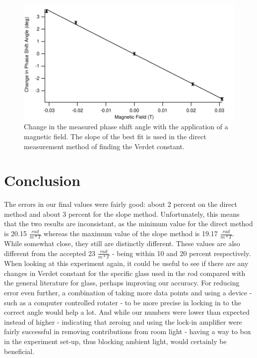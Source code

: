 \documentclass[prb,preprint]{revtex4-1}
\begin{document}
\begin{figure}[h]
\includegraphics[width=180mm]{dTheta_dT.pdf}
\caption{\label{dTheta_dT}Change in the measured phase shift angle with the application of a magnetic field. The slope of the best fit is used in the direct measurement method of finding the Verdet constant.}

\end{figure}

\section{Conclusion}
The errors in our final values were fairly good: about 2 percent on the direct method and about 3 percent for the slope method. Unfortunately, this means that the two results are inconsistant, as the minimum value for the direct method is 20.15 $\frac{rad}{m*T}$ whereas the maximum value of the slope method is 19.17 $\frac{rad}{m*T}$. While somewhat close, they still are distinctly different. These values are also different from the accepted 23 $\frac{rad}{m*T}$ - being within 10 and 20 percent respectively. When looking at this experiment again, it could be useful to see if there are any changes in Verdet constant for the specific glass used in the rod compared with the general literature for glass, perhaps improving our accuracy. For reducing error even further, a combination of taking more data points and using a device - such as a computer controlled rotater - to be more precise in locking in to the correct angle would help a lot. And while our numbers were lower than expected instead of higher - indicating that zeroing and using the lock-in amplifier were fairly successful in removing contributions from room light - having a way to box in the experiment set-up, thus blocking ambient light, would certainly be beneficial.
\end{document}

